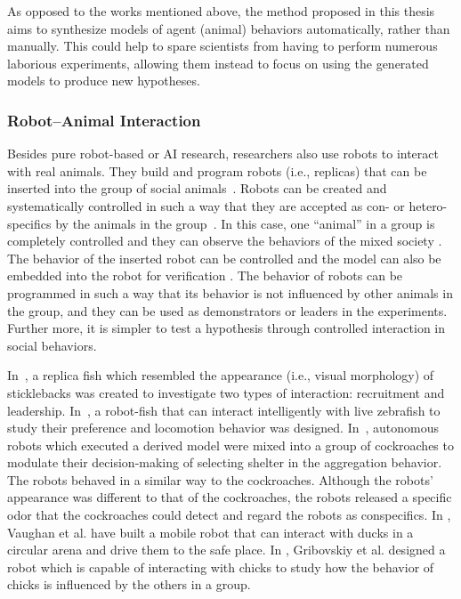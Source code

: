 As opposed to the works mentioned above, the method proposed in this thesis aims to synthesize models of agent (animal) behaviors automatically, rather than manually. This could help to spare scientists from having to perform numerous laborious experiments, allowing them instead to focus on using the generated models to produce new hypotheses. 

\subsubsection{Robot--Animal Interaction}\label{sec:robot_animal_interaction}

Besides pure robot-based or AI research, researchers also use robots to interact with real animals. They build and program robots (i.e., replicas) that can be inserted into the group of social animals~\cite{Faria2010, Halloy2013, J.Halloy2007, Thomas2013, Vaughan2000}. Robots can be created and systematically controlled in such a way that they are accepted as con- or hetero-specifics by the animals in the group~\cite{Krause2011}. In this case, one ``animal'' in a group is completely controlled and they can observe the behaviors of the mixed society \cite{J.Halloy_2007}. The behavior of the inserted robot can be controlled and the model can also be embedded into the robot for verification \cite{Krause_2011}. The behavior of robots can be programmed in such a way that its behavior is not influenced by other animals in the group, and they can be used as demonstrators or leaders in the experiments. Further more, it is simpler to test a hypothesis through controlled interaction in social behaviors. 

In~\cite{Faria2010}, a replica fish which resembled the appearance (i.e., visual morphology) of sticklebacks was created to investigate two types of interaction: recruitment and leadership. In~\citep{Kopman2013}, a robot-fish that can interact intelligently with live zebrafish to study their preference and locomotion behavior was designed. In~\cite{J.Halloy2007}, autonomous robots which executed a derived model were mixed into a group of cockroaches to modulate their decision-making of selecting shelter in the aggregation behavior. The robots behaved in a similar way to the cockroaches. Although the robots' appearance was different to that of the cockroaches, the robots released a specific odor that the cockroaches could detect and regard the robots as conspecifics. In \cite{Vaughan_1998, Vaughan2000}, Vaughan et al. have built a mobile robot that can interact with ducks in a circular arena and drive them to the safe place. In \cite{Gribovskiy_2010}, Gribovskiy et al. designed a robot which is capable of interacting with chicks to study how the behavior of chicks is influenced by the others in a group.  

